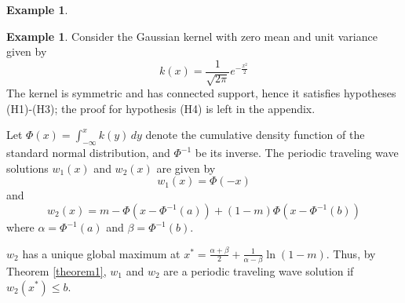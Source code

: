 \documentclass[11pt]{article}
\theoremstyle{definition}
\newtheorem{ex}[thm]{Example}
\numberwithin{equation}{section}
\numberwithin{thm}{section}
\begin{document}
\begin{ex}
%
%
%
%
%
%
%
%
%
%
%
%
%
%
%

\end{ex}

\begin{ex} Consider the Gaussian kernel with zero mean and unit variance given by
$$ k(x) = \frac{1}{\sqrt{2\pi}} e^{-\frac{x^2}{2}} $$
The kernel is symmetric and has connected support, hence it satisfies hypotheses (H1)-(H3); the proof for hypothesis (H4) is left in the appendix.

Let $\Phi(x)=\int_{-\infty}^{x}k(y)\,dy$ denote the cumulative density function of the standard normal distribution, and $\Phi^{-1}$ be its inverse. The periodic traveling wave solutions $w_1(x)$ and $w_2(x)$ are given by
\begin{equation}
w_1(x) = \Phi(-x)
\end{equation}
and
\begin{equation}
w_2(x)=  m - \Phi(x-\Phi^{-1}(a)) + (1-m)\Phi(x-\Phi^{-1}(b))
\end{equation}
where $\alpha=\Phi^{-1}(a)$ and $\beta=\Phi^{-1}(b)$.

$w_2$ has a unique global maximum at $x^*=\frac{\alpha+\beta}{2} + \frac{1}{\alpha-\beta}\ln\left(1-m\right)$. Thus, by Theorem \ref{theorem1}, $w_1$ and $w_2$ are a periodic traveling wave solution if $w_2(x^*)\leq b$.
\end{ex}
\end{document}
